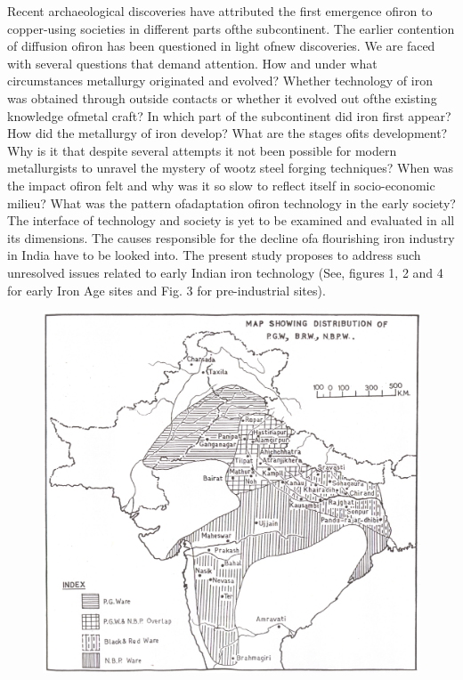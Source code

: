 Recent archaeological discoveries have attributed the first emergence ofiron to copper-using societies in different parts ofthe subcontinent. The earlier contention of diffusion ofiron has been questioned in light ofnew discoveries. We are faced with several questions that demand attention. How and under what circumstances metallurgy originated and evolved? Whether technology of iron was obtained through outside contacts or whether it evolved out ofthe existing knowledge ofmetal craft? In which part of the subcontinent did iron first appear? How did the metallurgy of iron develop? What are the stages ofits development? Why is it that despite several attempts it not been possible for modern metallurgists to unravel the mystery of wootz steel forging techniques? When was the impact ofiron felt and why was it so slow to reflect itself in socio-economic milieu? What was the pattern ofadaptation ofiron technology in the early society? The interface of technology and society is yet to be examined and evaluated in all its dimensions. The causes responsible for the decline ofa flourishing iron industry in India have to be looked into. The present study proposes to address such unresolved issues related to early Indian iron technology (See, figures 1, 2 and 4 for early Iron Age sites and Fig. 3 for pre-industrial sites).

\begin{figure}[H]
\includegraphics[scale=.8]{images/001.jpg}
\caption{}\label{chap1-fig1}
\end{figure}

